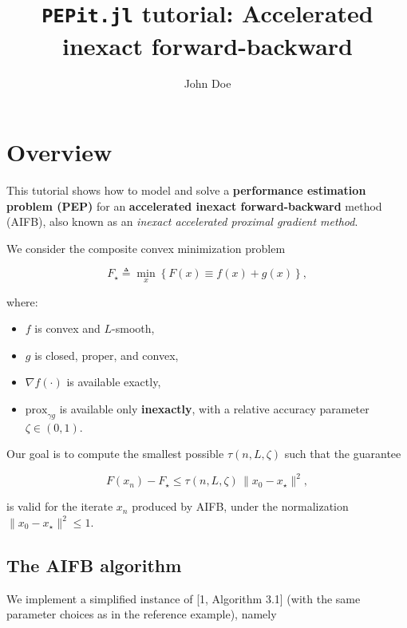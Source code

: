 \documentclass{article}
\title{\textbf{\textsf{\texttt{PEPit.jl} tutorial: Accelerated inexact forward-backward}}}
\author{John Doe}
\begin{document}
    \maketitle
    
    

\section{Overview}

This tutorial shows how to model and solve a \textbf{performance estimation problem (PEP)} for an \textbf{accelerated inexact forward-backward} method (AIFB), also known as an \emph{inexact accelerated proximal gradient method}.

We consider the composite convex minimization problem

\begin{equation}\label{aifb-problem}
F_\star \triangleq \min_x \left\{F(x) \equiv f(x) + g(x)\right\},
\end{equation}

where:

\begin{itemize}
\item $f$ is convex and $L$-smooth,
\item $g$ is closed, proper, and convex,
\item $\nabla f(\cdot)$ is available exactly,
\item $\mathrm{prox}_{\gamma g}$ is available only \textbf{inexactly}, with a relative accuracy parameter $\zeta \in (0,1)$.
\end{itemize}

Our goal is to compute the smallest possible $\tau(n,L,\zeta)$ such that the guarantee

\begin{equation}\label{aifb-goal}
F(x_n) - F_\star \le \tau(n,L,\zeta)\,\|x_0-x_\star\|^2,
\end{equation}

is valid for the iterate $x_n$ produced by AIFB, under the normalization $\|x_0-x_\star\|^2 \le 1$.

\subsection{The AIFB algorithm}

We implement a simplified instance of [1, Algorithm 3.1] (with the same parameter choices as in the reference example), namely
\end{document}
